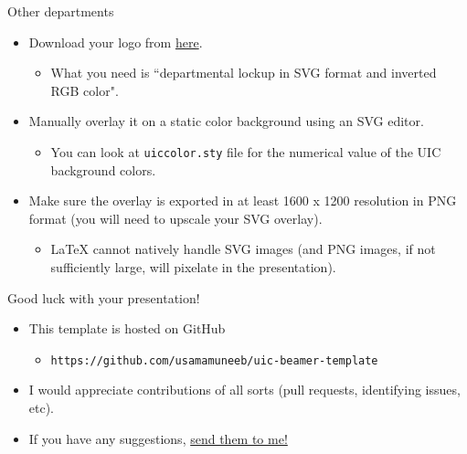 \documentclass{beamer}
\newcommand{\hrefcol}[2]{\textcolor{uihteal}{\href{#1}{#2}}}
\begin{document}
\begin{frame}[fragile]{Other departments}
\begin{itemize}
\item Download your logo from \hrefcol{https://marketing.uic.edu/marketing-toolbox/university-style-guide/university-marks-logos/}{here}.
    \begin{itemize}
    \item What you need is ``departmental lockup in SVG format and inverted RGB color".
    \end{itemize}
\item Manually overlay it on a static color background using an SVG editor.
    \begin{itemize}
    \item You can look at \verb|uiccolor.sty| file for the numerical value of the UIC background colors.
    \end{itemize}
\item Make sure the overlay is exported in at least 1600 x 1200 resolution in PNG format (you will need to upscale your SVG overlay).
    \begin{itemize}
    \item LaTeX cannot natively handle SVG images (and PNG images, if not sufficiently large, will pixelate in the presentation).
    \end{itemize}
\end{itemize}
\end{frame}


\begin{frame}[fragile]{Good luck with your presentation!}
\begin{itemize}
\item This template is hosted on GitHub
    \begin{itemize}
    \item  \verb|https://github.com/usamamuneeb/uic-beamer-template|
    \end{itemize}
\item  I would appreciate contributions of all sorts (pull requests, identifying issues, etc).
\item  If you have any suggestions,
\hrefcol{mailto:umunee2@uic.edu}{send them to me!}
\end{itemize}
\end{frame}


\backmatter
\end{document}
